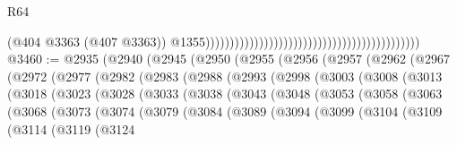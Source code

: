 \begin{lexlean}{R64}
\begin{coremodule}
                                                                                            (@404
                                                                                              @3363
                                                                                              (@407
                                                                                                @3363))
                                                                                            @1355))))))))))))))))))))))))))))))))))))))))))))
@3460 := @2935
    (@2940
      (@2945
        (@2950
          (@2955
            (@2956
              (@2957
                (@2962
                  (@2967
                    (@2972
                      (@2977
                        (@2982
                          (@2983
                            (@2988
                              (@2993
                                (@2998
                                  (@3003
                                    (@3008
                                      (@3013
                                        (@3018
                                          (@3023
                                            (@3028
                                              (@3033
                                                (@3038
                                                  (@3043
                                                    (@3048
                                                      (@3053
                                                        (@3058
                                                          (@3063
                                                            (@3068
                                                              (@3073
                                                                (@3074
                                                                  (@3079
                                                                    (@3084
                                                                      (@3089
                                                                        (@3094
                                                                          (@3099
                                                                            (@3104
                                                                              (@3109
                                                                                (@3114
                                                                                  (@3119
                                                                                    (@3124

\end{coremodule}
\end{lexlean}
